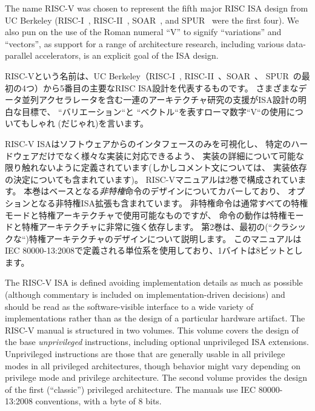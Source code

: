 \begin{commentary}
The name RISC-V was chosen to represent the fifth major RISC ISA
design from UC Berkeley (RISC-I~\cite{riscI-isca1981},
RISC-II~\cite{Katevenis:1983}, SOAR~\cite{Ungar:1984}, and
SPUR~\cite{spur-jsscc1989} were the first four).  We also pun on the
use of the Roman numeral ``V'' to signify ``variations'' and
``vectors'', as support for a range of architecture research,
including various data-parallel accelerators, is an explicit goal of
the ISA design.
\end{commentary}

\begin{commentary}
  RISC-Vという名前は、UC Berkeley（RISC-I~\cite{riscI-isca1981},
    RISC-II~\cite{Katevenis:1983}、SOAR~\cite{Ungar:1984}、
    SPUR~\cite{spur-jsscc1989}の最初の4つ）から5番目の主要なRISC
  ISA設計を代表するものです。
  さまざまなデータ並列アクセラレータを含む一連のアーキテクチャ研究の支援がISA設計の明白な目標で、
  ``バリエーション``と ``ベクトル``を表すローマ数字``V``の使用についてもしゃれ
  (だじゃれ)を言います。
\end{commentary}

RISC-V ISAはソフトウェアからのインタフェースのみを可視化し、
特定のハードウェアだけでなく様々な実装に対応できるよう、
実装の詳細について可能な限り触れないように定義されています(しかしコメント文については、
実装依存の決定についても含まれています)。
RISC-Vマニュアルは2巻で構成されています。
本巻はベースとなる{\em 非特権}命令のデザインについてカバーしており、
オプションとなる非特権ISA拡張も含まれています。
非特権命令は通常すべての特権モードと特権アーキテクチャで使用可能なものですが、
命令の動作は特権モードと特権アーキテクチャに非常に強く依存します。
第2巻は、最初の(``クラシックな``)特権アーキテクチャのデザインについて説明します。
このマニュアルはIEC 80000-13:2008で定義される単位系を使用しており、1バイトは8ビットとします。

The RISC-V ISA is defined avoiding implementation details as much as
possible (although commentary is included on implementation-driven
decisions) and should be read as the software-visible interface to a
wide variety of implementations rather than as the design of a
particular hardware artifact.  The RISC-V manual is structured in two
volumes.  This volume covers the design of the base {\em unprivileged}
instructions, including optional unprivileged ISA extensions.
Unprivileged instructions are those that are generally usable in all
privilege modes in all privileged architectures, though behavior might
vary depending on privilege mode and privilege architecture.  The
second volume provides the design of the first (``classic'')
privileged architecture. The manuals use IEC 80000-13:2008
conventions, with a byte of 8 bits.

